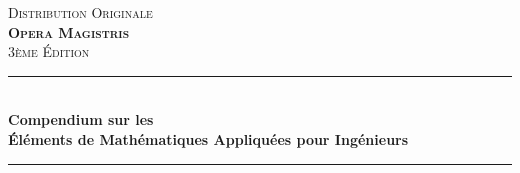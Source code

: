 \documentclass[12pt,a4paper,twoside,openright]{report}
\theoremstyle{definition}
\theoremstyle{itexmp}
\numberwithin{equation}{section}
\begin{document}
	\restoregeometry %
	\nopagecolor %
	\newpage\null\thispagestyle{empty}\newpage
	\restoregeometry
	\begin{titlepage}

\newcommand{\HRule}{\rule{\linewidth}{0.5mm}} %

\center %
 

\textsc{\Large Distribution Originale}\\[1.5cm] %
\textsc{\Huge \textbf{Opera Magistris}}\\[0.5cm] %
\textsc{\large 3ème Édition}\\[0.5cm] %


\HRule \\[0.4cm]
{ \Large \bfseries Compendium sur les \\ Éléments de Mathématiques Appliquées pour Ingénieurs}\\[0.4cm] %
\HRule \\[1.5cm]
 



\end{titlepage}
\end{document}
